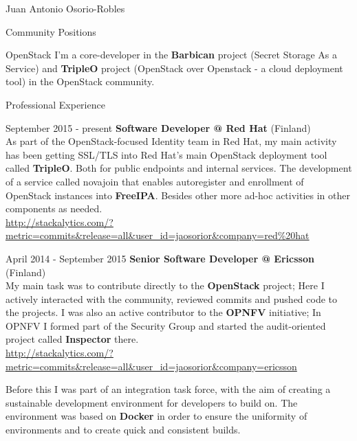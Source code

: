 \documentclass[english,10pt,letterpaper]{article}
\begin{document}
\begin{cv}{Juan Antonio Osorio-Robles}
    \begin{cvlist}{Community Positions}
		\item [OpenStack]
            I'm a core-developer in the \textbf{Barbican} project (Secret
            Storage As a Service) and \textbf{TripleO} project (OpenStack
            over Openstack - a cloud deployment tool) in the OpenStack
            community.
	\end{cvlist}

	\begin{cvlist}{Professional Experience}
		\item [September 2015 - present]
            \textbf{Software Developer @ Red Hat} (Finland)\\
            As part of the OpenStack-focused Identity team in Red Hat, my main
            activity has been getting SSL/TLS into Red Hat's main OpenStack
            deployment tool called \textbf{TripleO}. Both for public endpoints
            and internal services. The development of a service called novajoin
            that enables autoregister and enrollment of OpenStack instances
            into \textbf{FreeIPA}. Besides other more ad-hoc activities in
            other components as needed.\\

            \href{http://stackalytics.com/?metric=commits&release=all&user_id=jaosorior&company=red\%20hat}
            {\url{http://stackalytics.com/?metric=commits&release=all&user_id=jaosorior&company=red\%20hat}}

		\item [April 2014 - September 2015]
            \textbf{Senior Software Developer @ Ericsson} (Finland)\\
            My main task was to contribute directly to the
            \textbf{OpenStack} project; Here I actively interacted with the
            community, reviewed commits and pushed code to the projects.
            I was also an active contributor to the \textbf{OPNFV}
            initiative; In OPNFV I formed part of the Security Group and
            started the audit-oriented project called \textbf{Inspector}
            there.\\

            \href{http://stackalytics.com/?metric=commits&release=all&user_id=jaosorior&company=ericsson}
            {\url{http://stackalytics.com/?metric=commits&release=all&user_id=jaosorior&company=ericsson}}

            Before this I was part of an integration task force, with the
            aim of creating a sustainable development environment for
            developers to build on. The environment was based on
            \textbf{Docker} in order to ensure the uniformity of
            environments and to create quick and consistent builds.\\


\end{cvlist}
\end{cv}
\end{document}
